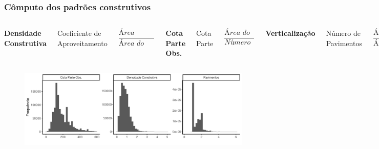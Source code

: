 \documentclass[%
    8pt, 
    aspectratio=169,
]{beamer}
\begin{document}
\begin{frame}
    \frametitle{Cômputo dos padrões construtivos}
    \bigskip

    \begin{columns}[T]
        \centering
        \textbf{Densidade Construtiva}
        
        Coeficiente de Aproveitamento
        
        \begin{equation*}
            \frac{\textit{Área Construída}}{\textit{Área do Terreno}}
        \end{equation*}

        \centering
        \textbf{Cota Parte Obs.}

        Cota Parte

        \begin{equation*}
            \frac{\textit{Área do Terreno}}{\textit{Número de Unidades}}
        \end{equation*}

        \centering 
        \textbf{Verticalização} \hyperlink{appendix:verticalizacao}{}

        Número de Pavimentos

        \begin{equation*}
            \frac{\textit{Área Construída}}{\textit{Área Ocupada}}
        \end{equation*}
    \end{columns}

    \bigskip

    \begin{figure}
        \centering
        \includegraphics[width = .85\textwidth]{imagens/indicadores.pdf}
    \end{figure}
\end{frame}
\end{document}
